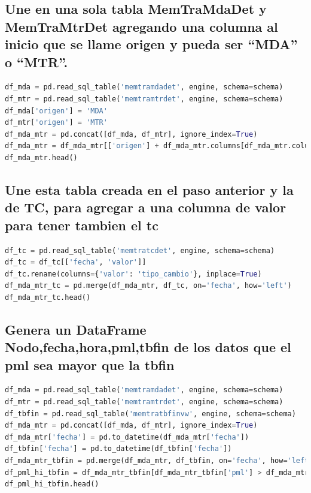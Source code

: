 \documentclass[11pt, a4paper]{article}
\begin{document}
\newpage
\subsection{Une en una sola tabla MemTraMdaDet y MemTraMtrDet agregando una columna al inicio que se llame origen y pueda ser “MDA” o “MTR”.}

\begin{lstlisting}[language=Python]
df_mda = pd.read_sql_table('memtramdadet', engine, schema=schema)
df_mtr = pd.read_sql_table('memtramtrdet', engine, schema=schema)
df_mda['origen'] = 'MDA'
df_mtr['origen'] = 'MTR'
df_mda_mtr = pd.concat([df_mda, df_mtr], ignore_index=True)
df_mda_mtr = df_mda_mtr[['origen'] + df_mda_mtr.columns[df_mda_mtr.columns != 'origen'].tolist()]
df_mda_mtr.head()
\end{lstlisting}



\subsection{Une esta tabla creada en el paso anterior y la de TC, para agregar a una columna de valor para tener tambien el tc}

\begin{lstlisting}[language=Python]
df_tc = pd.read_sql_table('memtratcdet', engine, schema=schema)
df_tc = df_tc[['fecha', 'valor']]
df_tc.rename(columns={'valor': 'tipo_cambio'}, inplace=True)
df_mda_mtr_tc = pd.merge(df_mda_mtr, df_tc, on='fecha', how='left')
df_mda_mtr_tc.head()
\end{lstlisting}

\subsection{Genera un DataFrame Nodo,fecha,hora,pml,tbfin de los datos que el pml sea mayor que la tbfin}

\begin{lstlisting}[language=Python]
df_mda = pd.read_sql_table('memtramdadet', engine, schema=schema)
df_mtr = pd.read_sql_table('memtramtrdet', engine, schema=schema)
df_tbfin = pd.read_sql_table('memtratbfinvw', engine, schema=schema)
df_mda_mtr = pd.concat([df_mda, df_mtr], ignore_index=True)
df_mda_mtr['fecha'] = pd.to_datetime(df_mda_mtr['fecha'])
df_tbfin['fecha'] = pd.to_datetime(df_tbfin['fecha'])
df_mda_mtr_tbfin = pd.merge(df_mda_mtr, df_tbfin, on='fecha', how='left')
df_pml_hi_tbfin = df_mda_mtr_tbfin[df_mda_mtr_tbfin['pml'] > df_mda_mtr_tbfin['tbfin']][['clanodo', 'fecha', 'hora', 'pml', 'tbfin']]
df_pml_hi_tbfin.head()
\end{lstlisting}
\end{document}
